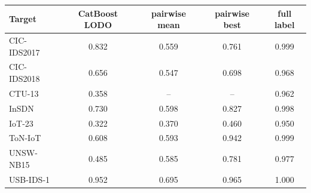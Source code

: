 \begin{tabular}{lcccc}
\toprule
Target & CatBoost LODO & pairwise mean & pairwise best & full label \\
\midrule
CIC-IDS2017 & 0.832 & 0.559 & 0.761 & 0.999 \\
CIC-IDS2018 & 0.656 & 0.547 & 0.698 & 0.968 \\
CTU-13 & 0.358 & -- & -- & 0.962 \\
InSDN & 0.730 & 0.598 & 0.827 & 0.998 \\
IoT-23 & 0.322 & 0.370 & 0.460 & 0.950 \\
ToN-IoT & 0.608 & 0.593 & 0.942 & 0.999 \\
UNSW-NB15 & 0.485 & 0.585 & 0.781 & 0.977 \\
USB-IDS-1 & 0.952 & 0.695 & 0.965 & 1.000 \\
\bottomrule
\end{tabular}
